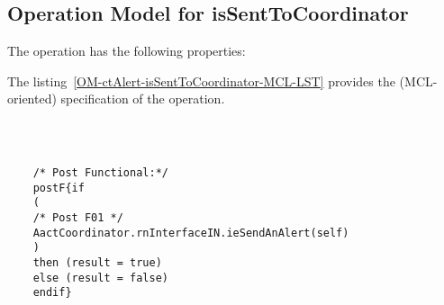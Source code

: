 \subsection{Operation Model for isSentToCoordinator}

\label{OM-isSentToCoordinator}


The  operation has the following properties:

	\begin{operationmodel}



		


	\end{operationmodel}



	\vspace{1cm}
	The listing~\ref{OM-ctAlert-isSentToCoordinator-MCL-LST} provides the \msrmessir (MCL-oriented) specification of the operation.
	
	\scriptsize
	\vspace{0.5cm}
	\begin{lstlisting}[style=MessirStyle,firstnumber=auto,captionpos=b,caption={\msrmessir (MCL-oriented) specification of the operation \emph{isSentToCoordinator}.},label=OM-ctAlert-isSentToCoordinator-MCL-LST]

	
	
	/* Post Functional:*/ 
	postF{if
	(
	/* Post F01 */
	AactCoordinator.rnInterfaceIN.ieSendAnAlert(self)
	)
	then (result = true)
	else (result = false)
	endif}
	
	
	\end{lstlisting}
	\normalsize 
	
	
	
	
	
